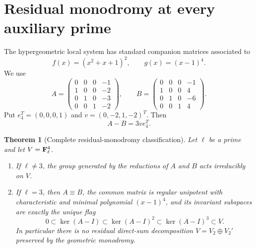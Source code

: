 \documentclass[11pt,letterpaper]{article}
\newtheorem{theorem}{Theorem}[section]
\theoremstyle{definition}
\theoremstyle{remark}
\begin{document}
\section{Residual monodromy at every auxiliary prime}

The hypergeometric local system has standard companion matrices associated to
\[
 f(x)=(x^2+x+1)^2,
 \qquad
 g(x)=(x-1)^4.
\]
We use
\[
 A=\begin{pmatrix}
0&0&0&-1\\1&0&0&-2\\0&1&0&-3\\0&0&1&-2
\end{pmatrix},\qquad
 B=\begin{pmatrix}
0&0&0&-1\\1&0&0&4\\0&1&0&-6\\0&0&1&4
\end{pmatrix}.
\]
Put $e_4^T=(0,0,0,1)$ and $v=(0,-2,1,-2)^T$.  Then
\[
 A-B=3ve_4^T.
\]

\begin{theorem}[Complete residual-monodromy classification]\label{III:thm:resmon}
Let $\ell$ be a prime and let $V=\mathbf F_\ell^4$.
\begin{enumerate}[label=(\alph*)]
\item If $\ell\neq3$, the group generated by the reductions of $A$ and $B$ acts irreducibly on $V$.
\item If $\ell=3$, then $A\equiv B$, the common matrix is regular unipotent with characteristic and
minimal polynomial $(x-1)^4$, and its invariant subspaces are exactly the unique flag
\[
 0\subset\ker(A-I)\subset\ker(A-I)^2\subset\ker(A-I)^3\subset V.
\]
In particular there is no residual direct-sum decomposition $V=V_2\oplus V_2'$ preserved by the
geometric monodromy.
\end{enumerate}
\end{theorem}
\end{document}
